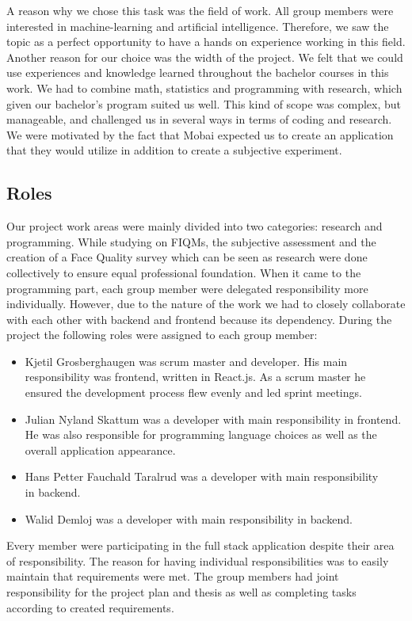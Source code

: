 A reason why we chose this task was the field of work. All group members were interested in machine-learning and artificial intelligence. Therefore, we saw the topic as a perfect opportunity to have a hands on experience working in this field. Another reason for our choice was the width of the project. We felt that we could use experiences and knowledge learned throughout the bachelor courses in this work. We had to combine math, statistics and programming with research, which given our bachelor's program suited us well. This kind of scope was complex, but manageable, and challenged us in several ways in terms of coding and research. We were motivated by the fact that Mobai expected us to create an application that they would utilize in addition to create a subjective experiment.   

\subsection{Roles}
\label{subsec:roles}
Our project work areas were mainly divided into two categories: research and programming. While studying on FIQMs, the subjective assessment and the creation of a Face Quality survey which can be seen as research were done collectively to ensure equal professional foundation. When it came to the programming part, each group member were delegated responsibility more individually. However, due to the nature of the work we had to closely collaborate with each other with backend and frontend because its dependency. During the project the following roles were assigned to each group member:
\begin{itemize}
    \item Kjetil Grosberghaugen was scrum master and developer. His main responsibility was frontend, written in React.js. As a scrum master he ensured the development process flew evenly and led sprint meetings.
    \item Julian Nyland Skattum was a developer with main responsibility in frontend. He was also responsible for programming language choices as well as the overall application appearance. 
    \item Hans Petter Fauchald Taralrud was a developer with main responsibility\\ in backend. 
    \item Walid Demloj was a developer with main responsibility in backend. 
\end{itemize}

Every member were participating in the full stack application despite their area of responsibility. The reason for having individual responsibilities was to easily maintain that requirements were met. The group members had joint responsibility for the project plan and thesis as well as completing tasks according to created requirements. 

